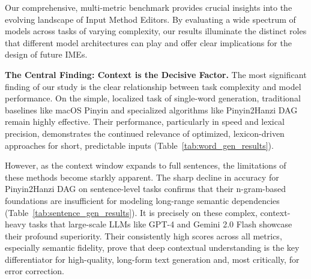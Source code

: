 \documentclass[10pt, a4paper]{article}
\begin{document}
Our comprehensive, multi-metric benchmark provides crucial insights into the evolving landscape of Input Method Editors. By evaluating a wide spectrum of models across tasks of varying complexity, our results illuminate the distinct roles that different model architectures can play and offer clear implications for the design of future IMEs.

\textbf{The Central Finding: Context is the Decisive Factor.}
The most significant finding of our study is the clear relationship between task complexity and model performance. On the simple, localized task of single-word generation, traditional baselines like macOS Pinyin and specialized algorithms like Pinyin2Hanzi DAG remain highly effective. Their performance, particularly in speed and lexical precision, demonstrates the continued relevance of optimized, lexicon-driven approaches for short, predictable inputs (Table~\ref{tab:word_gen_results}).

However, as the context window expands to full sentences, the limitations of these methods become starkly apparent. The sharp decline in accuracy for Pinyin2Hanzi DAG on sentence-level tasks confirms that their n-gram-based foundations are insufficient for modeling long-range semantic dependencies (Table~\ref{tab:sentence_gen_results}). It is precisely on these complex, context-heavy tasks that large-scale LLMs like GPT-4 and Gemini 2.0 Flash showcase their profound superiority. Their consistently high scores across all metrics, especially semantic fidelity, prove that deep contextual understanding is the key differentiator for high-quality, long-form text generation and, most critically, for error correction.

\end{document}
